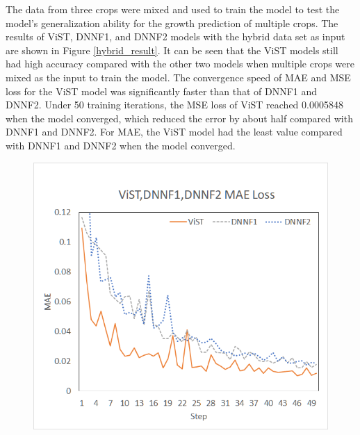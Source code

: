 \documentclass[acmsmall,manuscript, screen, review]{acmart}
\begin{document}
The data from three crops were mixed and used to train the model to test the model's generalization ability for the growth prediction of multiple crops. The results of ViST, DNNF1, and DNNF2 models with the hybrid data set as input are shown in Figure \ref{hybrid_result}. It can be seen that the ViST models still had high accuracy compared with the other two models when multiple crops were mixed as the input to train the model. The convergence speed of MAE and MSE loss for the ViST model was significantly faster than that of DNNF1 and DNNF2.  Under 50 training iterations, the MSE loss of ViST reached 0.0005848 when the model converged, which reduced the error by about half compared with DNNF1 and DNNF2. For MAE, the ViST model had the least value compared with DNNF1 and DNNF2 when the model converged.
\begin{figure}[htbp]
  \centering
  \begin{minipage}{0.49\linewidth}
    \centering
    \includegraphics[width=\linewidth]{pic/generalization_vist_dnnf1_dnnf2_mae.png}
  \end{minipage}
  \centering
  \begin{minipage}{0.49\linewidth}
    \centering

\end{minipage}
\end{figure}
\end{document}
